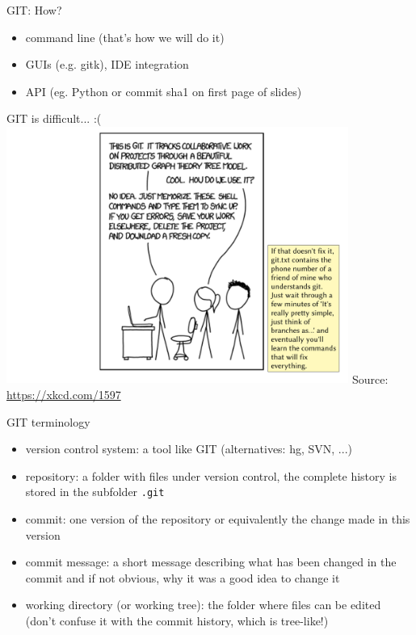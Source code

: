 \begin{frame}[fragile]{GIT: How?}
    \begin{itemize}
        \item command line (that's how we will do it)
        \item GUIs (e.g. gitk), IDE integration
        \item API (eg. Python or commit sha1 on first page of slides)
    \end{itemize}
\end{frame}

\begin{frame}[fragile]{GIT is difficult... :(}
    \includegraphics[width=0.84\textwidth]{images/xkcd-git-is-hard.pdf}
    \vfill
    {\tiny Source:
        \href{https://xkcd.com/1597kjA}{https://xkcd.com/1597}
    }
\end{frame}


\begin{frame}[fragile]{GIT terminology}
    \begin{itemize}
        \item version control system: a tool like GIT (alternatives: hg, SVN, ...)
        \item repository: a folder with files under version control, the complete history is
            stored in the subfolder \verb|.git|
        \item commit: one version of the repository or equivalently the change made in this
            version
        \item commit message: a short message describing what has been changed in the commit
            and if not obvious, why it was a good idea to change it
        \item working directory (or working tree): the folder where files can be edited (don't
            confuse it with the commit history, which is tree-like!)
    \end{itemize}
\end{frame}


